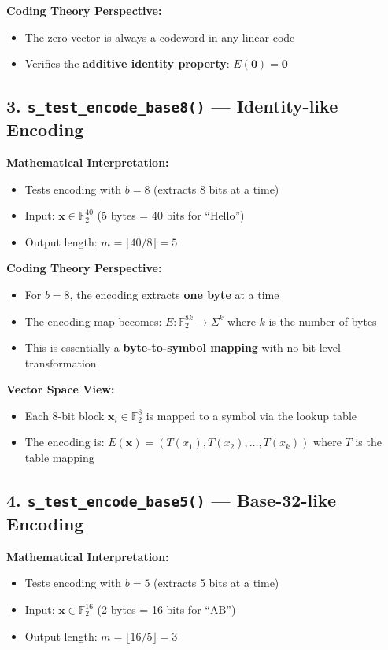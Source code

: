 \documentclass[11pt,a4paper]{article}
\begin{document}
\textbf{Coding Theory Perspective:}
\begin{itemize}
\item The zero vector is always a codeword in any linear code
\item Verifies the \textbf{additive identity property}: $E(\mathbf{0}) = \mathbf{0}$
\end{itemize}

\subsection{3. \texttt{s\_test\_encode\_base8()} --- Identity-like Encoding}

\textbf{Mathematical Interpretation:}
\begin{itemize}
\item Tests encoding with $b = 8$ (extracts 8 bits at a time)
\item Input: $\mathbf{x} \in \mathbb{F}_2^{40}$ (5 bytes = 40 bits for ``Hello'')
\item Output length: $m = \lfloor 40/8 \rfloor = 5$
\end{itemize}

\textbf{Coding Theory Perspective:}
\begin{itemize}
\item For $b = 8$, the encoding extracts \textbf{one byte} at a time
\item The encoding map becomes: $E: \mathbb{F}_2^{8k} \rightarrow \Sigma^k$ where $k$ is the number of bytes
\item This is essentially a \textbf{byte-to-symbol mapping} with no bit-level transformation
\end{itemize}

\textbf{Vector Space View:}
\begin{itemize}
\item Each 8-bit block $\mathbf{x}_i \in \mathbb{F}_2^8$ is mapped to a symbol via the lookup table
\item The encoding is: $E(\mathbf{x}) = (T(x_1), T(x_2), \ldots, T(x_k))$ where $T$ is the table mapping
\end{itemize}

\subsection{4. \texttt{s\_test\_encode\_base5()} --- Base-32-like Encoding}

\textbf{Mathematical Interpretation:}
\begin{itemize}
\item Tests encoding with $b = 5$ (extracts 5 bits at a time)
\item Input: $\mathbf{x} \in \mathbb{F}_2^{16}$ (2 bytes = 16 bits for ``AB'')
\item Output length: $m = \lfloor 16/5 \rfloor = 3$
\end{itemize}
\end{document}
